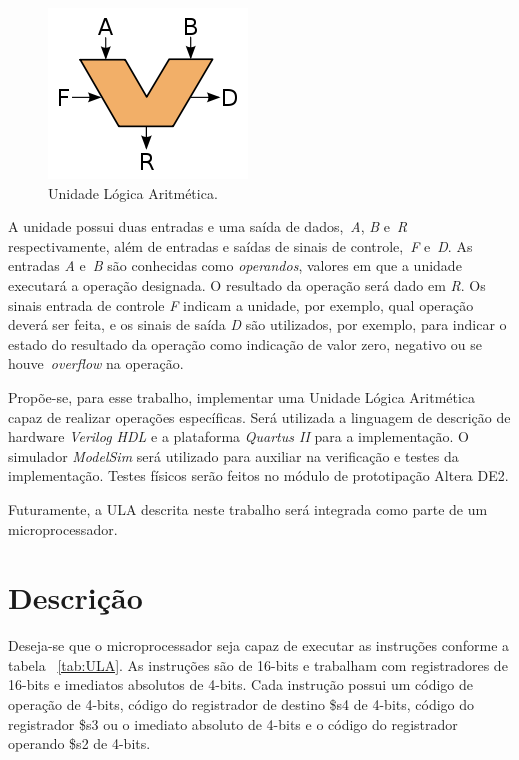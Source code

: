 \documentclass[11pt,a4paper,titlepage]{article}
\begin{document}
\begin{figure}[h]
\centering
\includegraphics[scale=0.8]{images/ALU_symbol.png}
\caption{Unidade Lógica Aritmética.}
\label{fig:ula}
\end{figure}

A unidade possui duas entradas e uma saída de dados,~\textit{A}, \textit{B} e~\textit{R} respectivamente, além de entradas e saídas de sinais de controle,~\textit{F} e~\textit{D}. As entradas \textit{A} e~\textit{B} são conhecidas como \textit{operandos}, valores em que a unidade executará a operação designada. O resultado da operação será dado em \textit{R}. Os sinais entrada de controle \textit{F} indicam a unidade, por exemplo, qual operação deverá ser feita, e os sinais de saída \textit{D} são utilizados, por exemplo, para indicar o estado do resultado da operação como indicação de valor zero, negativo ou se houve~\textit{overflow} na operação.

Propõe-se, para esse trabalho, implementar uma Unidade Lógica Aritmética capaz de realizar operações específicas. Será utilizada a linguagem de descrição de hardware \textit{Verilog HDL} e a plataforma \textit{Quartus II} para a implementação. O simulador \textit{ModelSim} será utilizado para auxiliar na verificação e testes da implementação. Testes físicos serão feitos no módulo de prototipação Altera DE2.

Futuramente, a ULA descrita neste trabalho será integrada como parte de um microprocessador.

\section{Descrição}\label{sec:desc}

Deseja-se que o microprocessador seja capaz de executar as instruções conforme a tabela ~\ref{tab:ULA}. As instruções são de 16-bits e trabalham com registradores de 16-bits e imediatos absolutos de 4-bits. Cada instrução possui um código de operação de 4-bits, código do registrador de destino \$s4 de 4-bits, código do registrador \$s3 ou o imediato absoluto de 4-bits e o código do registrador operando \$s2 de 4-bits.
\end{document}
